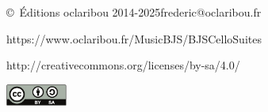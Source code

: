 \documentclass[a4paper,twoside]{article}
\newcommand{\anneecopyright}{2014-2025}
\begin{document}
\begin{titlepage}
{{\begin{center}
    \normalsize\sffamily
    
    \copyright\ Éditions oclaribou \anneecopyright\quad frederic@oclaribou.fr
    
    https://www.oclaribou.fr/MusicBJS/BJSCelloSuites
        
    \bigskip
    
    \small
    http://creativecommons.org/licenses/by-sa/4.0/
    
    \smallskip
    
    \includegraphics[width=2cm]{inc/by-sa}

    \end{center}
    \vspace*{0pt plus 0.1 fill}
  }}\hspace*{\fill}
  \vspace*{\fill}
\end{titlepage}
\restoregeometry
\end{document}
